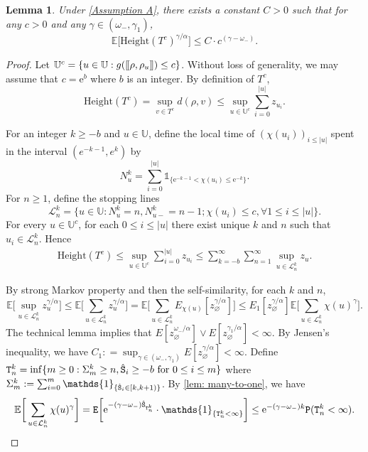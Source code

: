 \documentclass[12pt]{article}
\def\llbracket{[\hspace{-.10em} [ }
\def\rrbracket{ ] \hspace{-.10em}]}
\numberwithin{equation}{section}
\theoremstyle{plain}
\newtheorem{lem}[thm]{Lemma}
\theoremstyle{definition}
\begin{document}
\begin{lem}\label{lem: height truncated tree}
Under \cref{Assumption A}, there exists a constant $C>0$ such that for any $c>0$ and any $\gamma\in(\omega_-, \gamma_1)$,
\begin{equation}
\mathbb{E}\Big[\mathrm{Height}(T^c)^{\gamma/\alpha}\Big]\leq C\cdot c^{(\gamma-\omega_-)}.
\end{equation}
\end{lem}

\begin{proof}
Let $\mathbb{U}^c = \{u\in\mathbb{U}: g(\llbracket \rho, \rho_u \rrbracket)\leq c\}$. Without loss of generality, we may assume that $c = \mathrm{e}^{b}$ where $b$ is an integer. By definition of $T^c$,
\[\mathrm{Height}(T^c) = \sup_{v\in T^c} d(\rho, v) \leq \sup_{u\in\mathbb{U}^c} \sum^{|u|}_{i=0} z_{u_i}. \]

\noindent For an integer $k\geq -b$ and $u\in\mathbb{U}$, define the local time of $ (\chi(u_i))_{i\le |u|}$ spent in the interval $(e^{-k-1},e^k)$ by
\[N^k_{u} = \sum^{|u|}_{i=0} \mathds{1}_{\{\mathrm{e}^{-k-1}< \chi(u_i)\leq \mathrm{e}^{-k}\}}.\]
\noindent For $n\geq 1$, define the stopping lines
\begin{equation}\label{eq: def stopping line Lkn}
\mathcal{L}^{k}_n = \{u\in\mathbb{U}: N^k_u = n, N^{k}_{u-} = n-1; \chi(u_i) \leq c,\forall 1\leq i\leq |u|\}.
\end{equation}
For every $u\in\mathbb{U}^c$, for each $0\leq i\leq |u|$ there exist unique $k$ and $n$ such that $u_i\in \mathcal{L}^{k}_n$. Hence
\begin{align}\label{eq: height as sum}
    \mathrm{Height}(T^c) \leq \sup_{u\in\mathbb{U}^c}
 \sum^{|u|}_{i=0} z_{u_i}\leq \sum^{\infty}_{k=-b}\sum^{\infty}_{n=1} \sup_{u\in\mathcal{L}^k_n} z_u.
\end{align}

\noindent By strong Markov property and then the self-similarity, for each $k$ and $n$,
\[\mathbb{E}\bigg[\sup_{u\in\mathcal{L}^k_n} z_u^{\gamma/\alpha}\bigg] \leq \mathbb{E}\bigg[\sum_{u\in\mathcal{L}^k_n} z_u^{\gamma/\alpha}\bigg] = \mathbb{E}\bigg[\sum_{u\in\mathcal{L}^k_n} E_{\chi(u)}[z_{\varnothing}^{\gamma/\alpha}]\bigg]\leq E_1[z_{\varnothing}^{\gamma/\alpha}]\mathbb{E}\bigg[\sum_{u\in\mathcal{L}^k_n}\chi(u)^{\gamma}\bigg]. \]
\noindent The technical lemma \cite[Lemma 9.1]{BertoinJean2024SMta} implies that $E[z_{\varnothing}^{\omega_-/\alpha}]\vee E[z_{\varnothing}^{\gamma_1/\alpha}]<\infty$. By Jensen's inequality, we have $C_1: = \sup_{\gamma\in(\omega_-, \gamma_1)}E[z_{\varnothing}^{\gamma/\alpha}]<\infty$. Define ${\tt T}^k_n = \inf\{m\ge 0: \Sigma^k_m\geq n, {\hat{\tt S}}_i\geq - b \mbox{ for } 0\leq i\leq m\}$ where $\Sigma^k_m := \sum^m_{i=0} \mathds{1}_{\{{\hat{\tt S}}_i \in [k, k+1)\}}$. By \cref{lem: many-to-one}, we have
\[\mathbb{E}\bigg[\sum_{u\in\mathcal{L}^k_n} \chi(u)^{\gamma}\bigg] = {\tt E}\bigg[\mathrm{e}^{-(\gamma-\omega_-){\hat{\tt S}}_{{\tt T}^k_n}}\cdot \mathds{1}_{\{{\tt T}^k_n < \infty\}}\bigg]\leq \mathrm{e}^{-(\gamma-\omega_-)k}{\tt P}({\tt T}^k_n < \infty). \]


\end{proof}
\end{document}
